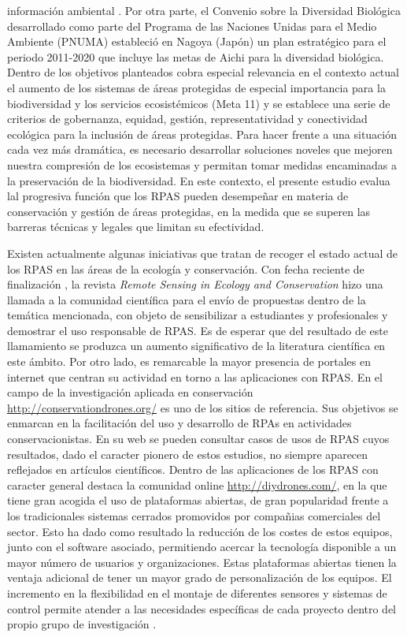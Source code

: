 \documentclass[11pt,]{article}
\begin{document}
información ambiental \citep{Forum2008}. Por otra parte, el Convenio
sobre la Diversidad Biológica desarrollado como parte del Programa de
las Naciones Unidas para el Medio Ambiente (PNUMA) estableció en Nagoya
(Japón) un plan estratégico para el periodo 2011-2020 que incluye las
metas de Aichi para la diversidad biológica. Dentro de los objetivos
planteados cobra especial relevancia en el contexto actual el aumento de
los sistemas de áreas protegidas de especial importancia para la
biodiversidad y los servicios ecosistémicos (Meta 11) y se establece una
serie de criterios de gobernanza, equidad, gestión, representatividad y
conectividad ecológica para la inclusión de áreas protegidas. Para hacer
frente a una situación cada vez más dramática, es necesario desarrollar
soluciones noveles que mejoren nuestra compresión de los ecosistemas y
permitan tomar medidas encaminadas a la preservación de la
biodiversidad. En este contexto, el presente estudio evalua lal
progresiva función que los RPAS pueden desempeñar en materia de
conservación y gestión de áreas protegidas, en la medida que se superen
las barreras técnicas y legales que limitan su efectividad.

Existen actualmente algunas iniciativas que tratan de recoger el estado
actual de los RPAS en las áreas de la ecología y conservación. Con fecha
reciente de finalización , la revista \emph{Remote Sensing in Ecology
and Conservation} hizo una llamada a la comunidad científica para el
envío de propuestas dentro de la temática mencionada, con objeto de
sensibilizar a estudiantes y profesionales y demostrar el uso
responsable de RPAS. Es de esperar que del resultado de este llamamiento
se produzca un aumento significativo de la literatura científica en este
ámbito. Por otro lado, es remarcable la mayor presencia de portales en
internet que centran su actividad en torno a las aplicaciones con RPAS.
En el campo de la investigación aplicada en conservación
\url{http://conservationdrones.org/} es uno de los sitios de referencia.
Sus objetivos se enmarcan en la facilitación del uso y desarrollo de
RPAs en actividades conservacionistas. En su web se pueden consultar
casos de usos de RPAS cuyos resultados, dado el caracter pionero de
estos estudios, no siempre aparecen reflejados en artículos científicos.
Dentro de las aplicaciones de los RPAS con caracter general destaca la
comunidad online \url{http://diydrones.com/}, en la que tiene gran
acogida el uso de plataformas abiertas, de gran popularidad frente a los
tradicionales sistemas cerrados promovidos por compañias comerciales del
sector. Esto ha dado como resultado la reducción de los costes de estos
equipos, junto con el software asociado, permitiendo acercar la
tecnología disponible a un mayor número de usuarios y organizaciones.
Estas plataformas abiertas tienen la ventaja adicional de tener un mayor
grado de personalización de los equipos. El incremento en la
flexibilidad en el montaje de diferentes sensores y sistemas de control
permite atender a las necesidades específicas de cada proyecto dentro
del propio grupo de investigación \citep{Koh2012}.
\end{document}
